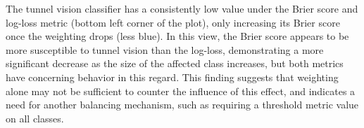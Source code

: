 
The tunnel vision classifier has a consistently low value under the Brier score and log-loss metric (bottom left corner of the plot), only increasing its Brier score once the weighting drops (less blue).
In this view, the Brier score appears to be more susceptible to tunnel vision than the log-loss, demonstrating a more significant decrease as the size of the affected class increases, but both metrics have concerning behavior in this regard.
This finding suggests that weighting alone may not be sufficient to counter the influence of this effect, and indicates a need for another balancing mechanism, such as requiring a threshold metric value on all classes.



